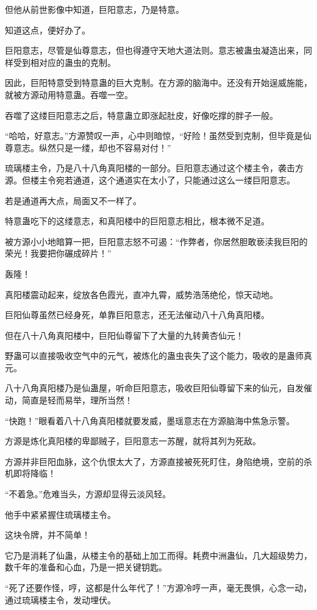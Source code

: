 \begin{this_body}
但他从前世影像中知道，巨阳意志，乃是特意。

知道这点，便好办了。

巨阳意志，尽管是仙尊意志，但也得遵守天地大道法则。意志被蛊虫凝造出来，同样受到相对应的蛊虫的克制。

因此，巨阳特意受到特意蛊的巨大克制。在方源的脑海中。还没有开始逞威施能，就被方源动用特意蛊。吞噬一空。

吞噬了这缕巨阳意志之后，特意蛊立即涨起肚皮，好像吃撑的胖子一般。

“哈哈，好意志。”方源赞叹一声，心中则暗惊，“好险！虽然受到克制，但毕竟是仙尊意志。纵然只是一缕，却也不容易对付！”

琉璃楼主令，乃是八十八角真阳楼的一部分。巨阳意志通过这个楼主令，袭击方源。但楼主令宛若通道，这个通道实在太小了，只能通过这么一缕巨阳意志。

若是通道再大点，局面又不一样了。

特意蛊吃下的这缕意志，和真阳楼中的巨阳意志相比，根本微不足道。

被方源小小地暗算一把，巨阳意志怒不可遏：“作弊者，你居然胆敢亵渎我巨阳的荣光！我要把你碾成碎片！”

轰隆！

真阳楼震动起来，绽放各色霞光，直冲九霄，威势浩荡绝伦，惊天动地。

巨阳仙尊虽然已经身死，单靠巨阳意志，还无法催动八十八角真阳楼。

但在八十八角真阳楼中，巨阳仙尊留下了大量的九转黄杏仙元！

野蛊可以直接吸收空气中的元气，被炼化的蛊虫丧失了这个能力，吸收的是蛊师真元。

八十八角真阳楼乃是仙蛊屋，听命巨阳意志，吸收巨阳仙尊留下来的仙元，自发催动，简直是轻而易举，理所当然！

“快跑！”眼看着八十八角真阳楼就要发威，墨瑶意志在方源脑海中焦急示警。

方源是炼化真阳楼的卑鄙贼子，巨阳意志一苏醒，就将其列为死敌。

方源并非巨阳血脉，这个仇恨太大了，方源直接被死死盯住，身陷绝境，空前的杀机即将降临！

“不着急。”危难当头，方源却显得云淡风轻。

他手中紧紧握住琉璃楼主令。

这块令牌，并不简单！

它乃是消耗了仙蛊，从楼主令的基础上加工而得。耗费中洲蛊仙，几大超级势力，数千年的准备和心血，乃是一把关键钥匙。

“死了还要作怪，哼，这都是什么年代了！”方源冷哼一声，毫无畏惧，心念一动，通过琉璃楼主令，发动埋伏。


\end{this_body}
